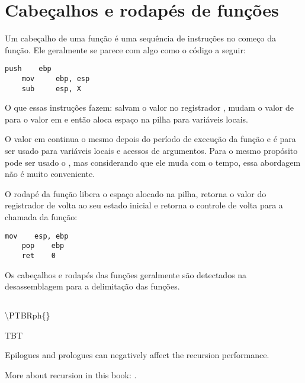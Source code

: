 \section{Cabeçalhos e rodapés de funções}
\label{sec:prologepilog}
\myindex{\PTBRph{}} %
\myindex{\PTBRph{}} %

Um cabeçalho de uma função é uma sequência de instruções no começo da função. Ele geralmente se parece com algo como o código a seguir:

\begin{lstlisting}[style=customasm]
    push    ebp
    mov     ebp, esp
    sub     esp, X
\end{lstlisting}

O que essas instruções fazem: salvam o valor no registrador \EBP, mudam o valor de \EBP para o valor em \ESP e então aloca espaço na pilha para variáveis locais.

O valor em \EBP continua o mesmo depois do período de execução da função e é para ser usado para variáveis locais e acessos de argumentos.
Para o mesmo propósito pode ser usado o \ESP, mas considerando que ele muda com o tempo, essa abordagem não é muito conveniente.

O rodapé da função libera o espaço alocado na pilha, retorna o valor do registrador \EBP de volta ao seu estado inicial e retorna o controle de volta para a chamada da função:

\begin{lstlisting}[style=customasm]
    mov    esp, ebp
    pop    ebp
    ret    0
\end{lstlisting}

Os cabeçalhos e rodapés das funções geralmente são detectados na desassemblagem para a delimitação das funções.

\subsection{\Recursion}

\ac{\PTBRph{}}

\myindex{\Recursion}
\ac{TBT}

Epilogues and prologues can negatively affect the recursion performance.

More about recursion in this book: .

